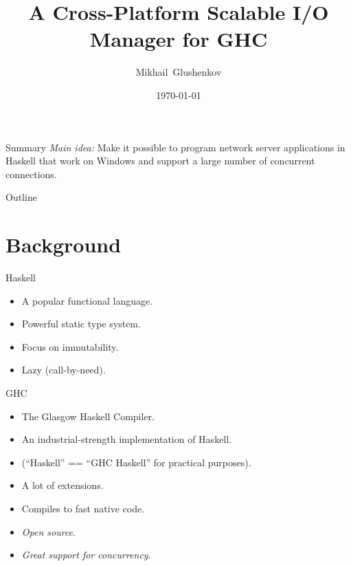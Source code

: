 \documentclass{beamer}
\title{A Cross-Platform Scalable I/O Manager for GHC}
\author{Mikhail~Glushenkov}
\date{\today}
\begin{document}
\begin{frame}
  \titlepage
\end{frame}

\begin{frame}{Summary}
  \emph{Main idea:} Make it possible to program network server applications in
  Haskell that work on Windows and support a large number of concurrent
  connections.
\end{frame}

\begin{frame}{Outline}
  \tableofcontents
\end{frame}

\section {Background}


\begin{frame}{Haskell}
  \begin{itemize}
  \item A popular functional language.
  \item Powerful static type system.
  \item Focus on immutability.
  \item Lazy (call-by-need).
  \end{itemize}
\end{frame}

\begin{frame}{GHC}
  \begin{itemize}
  \item The Glasgow Haskell Compiler.
  \item An industrial-strength implementation of Haskell.
  \item (``Haskell'' == ``GHC Haskell'' for practical purposes).
  \item A lot of extensions.
  \item Compiles to fast native code.
  \item \emph{Open source}.
  \item \emph{Great support for concurrency}.
  \end{itemize}
\end{frame}
\end{document}
